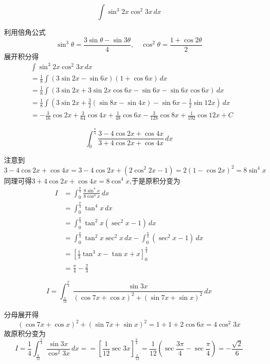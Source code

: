 \begin{questions}
    \question 
    \[
    \int \sin^3 2x \cos^2 3x \, dx
    \]
    \begin{solution}
        利用倍角公式 
        \[
        \sin^3 \theta = \frac{3\sin \theta - \sin 3\theta}{4},\quad \cos^2 \theta = \frac{1+\cos 2\theta}{2}
        \]
        展开积分得
        \begin{align*}
        &\int \sin^3 2x \cos^2 3x \, dx \\
        &= \frac{1}{8} \int (3 \sin 2x - \sin 6x)(1 + \cos 6x) \,dx \\
        &= \frac{1}{8} \int (3 \sin 2x + 3 \sin 2x \cos 6x - \sin 6x - \sin 6x \cos 6x) \,dx \\
        &= \frac{1}{8} \int \left( 3 \sin 2x + \frac{3}{2}(\sin 8x - \sin 4x) - \sin 6x - \frac{1}{2} \sin 12x \right) \,dx \\
        &= -\frac{3}{16} \cos 2x + \frac{3}{64} \cos 4x + \frac{1}{48} \cos 6x - \frac{3}{128} \cos 8x + \frac{1}{192} \cos 12x + C
        \end{align*}
    \end{solution}

    \question 
    \[
    \int_{0}^{\frac{\pi}{4}} \frac{3 - 4\cos 2x + \cos 4x}{3 + 4\cos 2x + \cos 4x} \, dx
    \]
    \begin{solution}
        注意到
        \[
        3 - 4\cos 2x + \cos 4x = 3 - 4\cos 2x + (2\cos^2 2x - 1)= 2(1 - \cos 2x)^2 = 8\sin^4 x
        \]
        同理可得$3 + 4\cos 2x + \cos 4x= 8\cos^4 x$,于是原积分变为
        \begin{align*}
        I &= \int_{0}^{\frac{\pi}{4}} \frac{8\sin^4 x}{8\cos^4 x} \, dx \\
        &= \int_{0}^{\frac{\pi}{4}} \tan^4 x \, dx \\
        &= \int_{0}^{\frac{\pi}{4}} \tan^2 x (\sec^2 x - 1) \, dx \\
        &= \int_{0}^{\frac{\pi}{4}} \tan^2 x \sec^2 x \, dx - \int_{0}^{\frac{\pi}{4}} (\sec^2 x - 1) \, dx \\
        &= \left[ \frac{1}{3}\tan^3 x - \tan x + x \right]_{0}^{\frac{\pi}{4}} \\
        &= \frac{\pi}{4} - \frac{2}{3}
        \end{align*}
    \end{solution}

    \question
    \[
    I = \int_{\frac{\pi}{12}}^{\frac{\pi}{4}}\frac{\sin 3x}{(\cos 7x+\cos x)^{2}+(\sin 7x+\sin x)^{2}} \, dx
    \]
    \begin{solution}
        分母展开得
        \[
        (\cos 7x+\cos x)^{2}+(\sin 7x+\sin x)^{2} = 1+1+2\cos 6x = 4\cos^2 3x
        \]
        故原积分变为
        \[
        I = \frac{1}{4} \int_{\frac{\pi}{12}}^{\frac{\pi}{4}} \frac{\sin 3x}{\cos^2 3x} \, dx = = \left[ \frac{1}{12} \sec 3x \right]_{\frac{\pi}{12}}^{\frac{\pi}{4}} = \frac{1}{12} \left( \sec \frac{3\pi}{4} - \sec \frac{\pi}{4} \right) = -\frac{\sqrt{2}}{6}
        \]
    \end{solution}


\end{questions}
